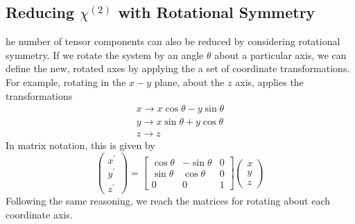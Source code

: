 
\subsection{Reducing \texorpdfstring{$\chi^{(2)}$}{Lg} with Rotational Symmetry}\label{sec:background:NonlinearOptics:rotation}
he number of tensor components can also be reduced by considering rotational symmetry. If we rotate the system by an angle $\theta$ about a particular axis, we can define the new, rotated axes by applying the a set of coordinate transformations. For example, rotating in the $x-y$ plane, about the $z$ axis, applies the transformations
\begin{equation}\label{eq:background:NonlinearOptics:rotation:generalTrans}
    \begin{split}
        x \rightarrow x \cos{\theta} - y \sin{\theta} \\
        y \rightarrow x \sin{\theta} +y \cos{\theta} \\
        z \rightarrow z
    \end{split}
\end{equation}
In matrix notation, this is given by
\begin{equation}\label{eq:background:NonlinearOptics:rotation:MatrixTrans}
	\begin{pmatrix}
		x^{\prime}\\ 
		y^{\prime}\\ 
		z^{\prime}
	\end{pmatrix} =
	\begin{bmatrix}
		\cos{\theta} & -\sin{\theta} & 0\\ 
		\sin{\theta} & \cos{\theta} & 0\\ 
		0 & 0 & 1
	\end{bmatrix}
	\begin{pmatrix}
		x\\ 
		y\\ 
		z
	\end{pmatrix}
\end{equation}
Following the same reasoning, we reach the matrices for rotating about each coordinate axis.
